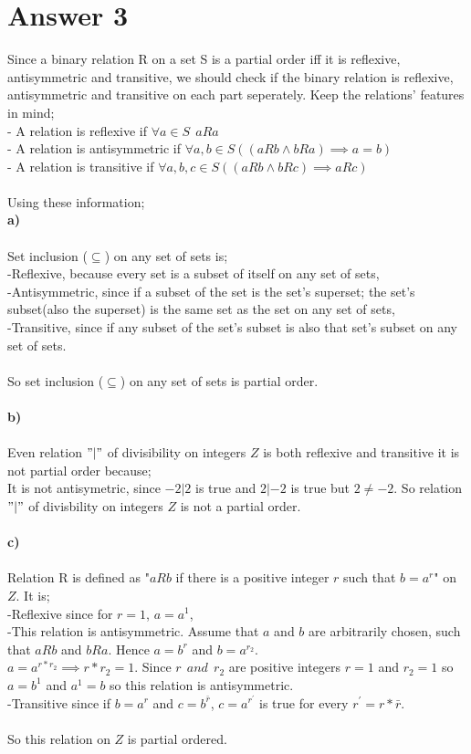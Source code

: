 \documentclass[12pt]{article}
\begin{document}
\section*{Answer 3}
Since a binary relation R on a set S is a partial order iff it is reflexive, antisymmetric and transitive, we should check if the binary relation is reflexive, antisymmetric and transitive on each part seperately. Keep the relations' features in mind;
\\
- A relation is reflexive if $\forall a \in S \ \ aRa$\\
- A relation is antisymmetric if $\forall{a,b} \in S ((aRb \land bRa) \implies a=b)$\\
- A relation is transitive if $\forall{a,b,c} \in S ((aRb \land bRc) \implies aRc)$
\\\\
Using these information;
\\
\textbf{a)}
\\\\
Set inclusion ($ \subseteq $) on any set of sets is;\\
-Reflexive, because every set is a subset of itself on any set of sets,\\
-Antisymmetric, since if a subset of the set is the set's superset; the set's subset(also the superset) is the same set as the set on any set of sets,\\
-Transitive, since if any subset of the set's subset is also that set's subset on any set of sets.
\\\\
So set inclusion ($\subseteq$) on any set of sets is partial order.
\\\\
\textbf{b)}
\\\\
Even relation $"|"$ of divisibility on integers $Z$ is both reflexive and transitive it is not partial order because;\\
It is not antisymetric, since $-2|2$ is true and $2|-2$ is true but $2 \neq -2$. So relation $"|"$ of divisbility on integers $Z$ is not a partial order.
\\\\
\textbf{c)}
\\\\
Relation R is defined as "$aRb$ if there is a positive integer $r$ such that $b=a^r$" on $Z$. It is;\\
-Reflexive since for $r=1$, $a=a^1$,\\
-This relation is antisymmetric. Assume that $a$ and $b$ are arbitrarily chosen, such that $aRb$ and $bRa$. Hence $a=b^r$ and $b=a^{r_2}$.\\
$a=a^{r*r_2} \implies r*r_2 =1$. Since $r \ \ and \ \ r_2$ are positive integers $r=1$ and $r_2 = 1$ so $a=b^1$ and $a^1=b$ so this relation is antisymmetric.\\ 
-Transitive since if $b=a^r$ and $c=b^{\bar{r}}$, $c=a^{r^{'}}$ is true for every $r^{'}=r*\bar{r}$.\\
\\
So this relation on $Z$ is partial ordered.
\end{document}
